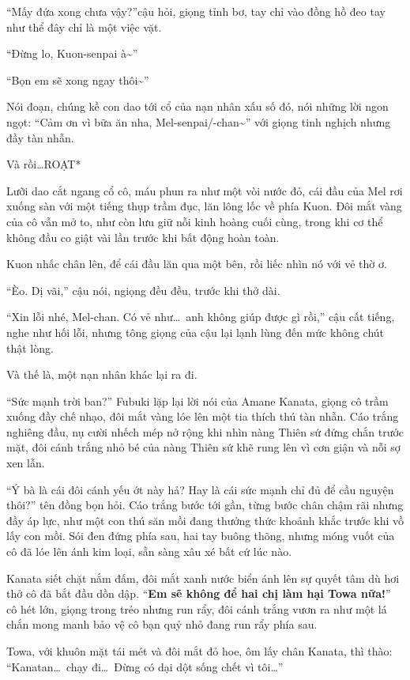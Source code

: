 \documentclass[../main.tex]{subfiles}
\begin{document}
``Mấy đứa xong chưa vậy?''cậu hỏi, giọng tỉnh bơ, tay chỉ vào đồng hồ đeo tay như thể đây chỉ là một việc vặt.

``Đừng lo, Kuon-senpai à\~{}''

``Bọn em sẽ xong ngay thôi\~{}''

Nói đoạn, chúng kề con dao tới cổ của nạn nhân xấu số đó, nói những lời ngon ngọt: ``Cảm ơn vì bữa ăn nha, Mel-senpai/-chan\~{}'' với giọng tinh nghịch nhưng đầy tàn nhẫn.

Và rồi\dots *ROẠT*

Lưỡi dao cắt ngang cổ cô, máu phun ra như một vòi nước đỏ, cái đầu của Mel rơi xuống sàn với một tiếng thụp trầm đục, lăn lông lốc về phía Kuon. Đôi mắt vàng của cô vẫn mở to, như còn lưu giữ nỗi kinh hoàng cuối cùng, trong khi cơ thể không đầu co giật vài lần trước khi bất động hoàn toàn.

Kuon nhấc chân lên, để cái đầu lăn qua một bên, rồi liếc nhìn nó với vẻ thờ ơ.

``Èo. Dị vãi,'' cậu nói, ngiọng đều đều, trước khi thở dài.

``Xin lỗi nhé, Mel-chan. Có vẻ như\dots\ anh không giúp được gì rồi,'' cậu cất tiếng, nghe như hối lỗi, nhưng tông giọng của cậu lại lạnh lùng đến mức không chút thật lòng.

Và thế là, một nạn nhân khác lại ra đi.

\il

``Sức mạnh trời ban?'' Fubuki lặp lại lời nói của Amane Kanata, giọng cô trầm xuống đầy chế nhạo, đôi mắt vàng lóe lên một tia thích thú tàn nhẫn. Cáo trắng nghiêng đầu, nụ cười nhếch mép nở rộng khi nhìn nàng Thiên sứ đứng chắn trước mặt, đôi cánh trắng nhỏ bé của nàng Thiên sứ khẽ rung lên vì cơn giận và nỗi sợ xen lẫn.

``Ý bà là cái đôi cánh yếu ớt này hả? Hay là cái sức mạnh chỉ đủ để cầu nguyện thôi?'' tên đồng bọn hỏi. Cáo trắng bước tới gần, từng bước chân chậm rãi nhưng đầy áp lực, như một con thú săn mồi đang thưởng thức khoảnh khắc trước khi vồ lấy con mồi. Sói đen đứng phía sau, hai tay buông thõng, nhưng móng vuốt của cô đã lóe lên ánh kim loại, sẵn sàng xâu xé bất cứ lúc nào.

Kanata siết chặt nắm đấm, đôi mắt xanh nước biển ánh lên sự quyết tâm dù hơi thở cô đã bắt đầu dồn dập. ``\textbf{Em sẽ không để hai chị làm hại Towa nữa!}'' cô hét lớn, giọng trong trẻo nhưng run rẩy, đôi cánh trắng vươn ra như một lá chắn mong manh bảo vệ cô bạn quỷ nhỏ đang run rẩy phía sau.

Towa, với khuôn mặt tái mét và đôi mắt đỏ hoe, ôm lấy chân Kanata, thì thào: ``Kanatan\dots\ chạy đi\dots\ Đừng có dại dột sống chết vì tôi\dots''
\end{document}
